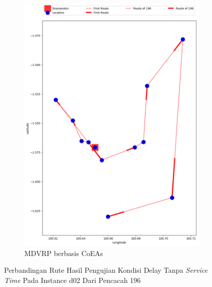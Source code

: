 \begin{figure}[H]
	\centering
	\begin{subfigure}[t]{\textwidth}
		\centering
		\includegraphics[width=\textwidth]{Resources/Images/delayed_2/real_m15_n100_delayed_2_196_coes}
		\caption{MDVRP berbasis CoEAs}
		\label{fig:real_m15_n100_delayed_2_196_coes}
	\end{subfigure}
	\caption{Perbandingan Rute Hasil Pengujian Kondisi Delay Tanpa \textit{Service Time} Pada Instance d02 Dari Pencacah 196}
	\label{fig:real_m15_n100_delayed_2_196}
\end{figure}


